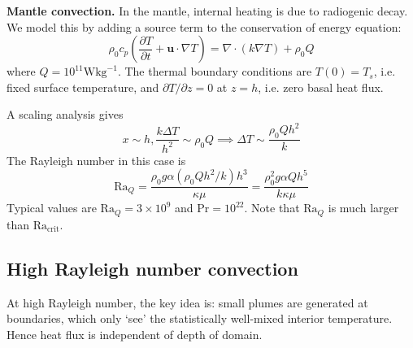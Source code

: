 \documentclass{jknotes}
\begin{document}
\begin{eg}
	\textbf{Mantle convection.} In the mantle, internal heating is due to
	radiogenic decay. We model this by adding a source term to the conservation of
	energy equation:
	\begin{equation}
		\rho_0 c_p \left( \frac{\partial T}{\partial t} + \symbf{u}\cdot\nabla
		T\right) = \nabla \cdot (k\nabla T) + \rho_0 Q
	\end{equation}
	where $Q = 10^{11} \text{W} \text{kg}^{-1}$. The thermal boundary conditions
	are $T(0) = T_s$, i.e. fixed surface temperature, and $\partial T / \partial
	z = 0$ at $z=h$, i.e. zero basal heat flux.

	A scaling analysis gives 
	\begin{equation}
		x \sim h, \frac{k \Delta T}{h^2} \sim \rho_0 Q
		\implies \Delta T \sim \frac{\rho_0 Q h^2}{k}
	\end{equation}
	The Rayleigh number in this case is
	\begin{equation}
		\text{Ra}_Q = \frac{\rho_0 g \alpha (\rho_0 Q h^2 / k) h^3}{\kappa \mu} =
		\frac{\rho_0^2 g \alpha Q h^5}{k \kappa \mu}
	\end{equation}
	Typical values are $\text{Ra}_Q = 3 \times 10^9$ and $\text{Pr} = 10^{22}$.
	Note that $\text{Ra}_Q$ is much larger than $\text{Ra}_{\text{crit}}$.
\end{eg}

\subsection{High Rayleigh number convection}
At high Rayleigh number, the key idea is: small plumes are generated at
boundaries, which only `see' the statistically well-mixed interior
temperature. Hence heat flux is independent of depth of domain.
\begin{center}
\end{center}
\end{document}
